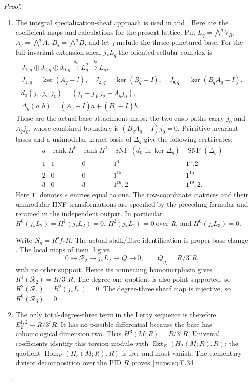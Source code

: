 \begin{proof}
\begin{enumerate}[label=\arabic*.]
\item The integral specialization-sheaf approach is used in
\cite[Lemma 7.25 and Propositions 7.26--7.27, pp.~61--63]{AC26}
and \cite[section ``The integral homology'']{E26}.
Here are the coefficient maps and calculations for the present lattice.  Put $L_q=\bigwedge^qV_R$, $A_q=\bigwedge^qA$,
$B_q=\bigwedge^qB$, and let $j$ include the thrice-punctured base.
For the full invariant-extension sheaf $j_*L_q$ the oriented
cellular complex is
\[
\begin{gathered}
 J_{1,q}\oplus J_{2,q}\oplus J_{0,q}
 \xrightarrow{d_0}L_q^2\xrightarrow{\Delta_q}L_q,\\
 J_{1,q}=\ker(A_q-I),\quad J_{2,q}=\ker(B_q-I),\quad
 J_{0,q}=\ker(B_qA_q-I),\\
 d_0(j_1,j_2,j_0)=(j_1-j_0,j_2-A_qj_0),\\
 \Delta_q(a,b)=(A_q-I)a+(B_q-I)b.
\end{gathered}
\]
These are the actual base attachment maps: the two cusp paths
carry $j_0$ and $A_qj_0$, whose combined boundary is
$(B_qA_q-I)j_0=0$.  Primitive invariant bases and a unimodular
kernel basis of $\Delta_q$ give the following certificates:
\[
\begin{array}{c|c|c|c|c}
q&\operatorname{rank}H^0&\operatorname{rank}H^1&
 \operatorname{SNF}(d_0\text{ in }\ker\Delta_q)&
 \operatorname{SNF}(\Delta_q)\\\hline
1&1&0&1^6&1^5,2\\
2&0&0&1^{15}&1^{15}\\
3&0&3&1^{16},2&1^{19},2.
\end{array}
\]
Here $1^s$ denotes $s$ entries equal to one.  The row-coordinate
matrices and their unimodular HNF transformations are specified
by the preceding formulas and retained in the independent output.
In particular $H^0(j_*L_2)=H^1(j_*L_2)=0$,
$H^2(j_*L_1)=0$ over $R$, and $H^0(j_*L_3)=0$.

Write $\mathcal R_q=R^qf_*R$.  The actual stalk/fibre
identification is proper base change
\cite[Tag 09V5, Lemma 20.18.1]{StacksProject}.
The local maps of item~3 give
\[
 0\longrightarrow\mathcal R_2\longrightarrow j_*L_2
 \longrightarrow Q\longrightarrow0,
 \qquad Q_{p_2}=R/3^rR,
\]
with no other support.  Hence its connecting homomorphism gives
$H^1(\mathcal R_2)=R/3^rR$.
The degree-one quotient is also point supported, so
$H^2(\mathcal R_1)=H^2(j_*L_1)=0$.
The degree-three sheaf map is injective, so
$H^0(\mathcal R_3)=0$.

\item The only total-degree-three term in the Leray sequence
\cite[Tag 01F2, Lemma 20.13.4]{StacksProject} is therefore
$E_2^{1,2}=R/3^rR$.  It has no possible differential because
the base has cohomological dimension two.  Thus
$H^3(M;R)=R/3^rR$.
Universal coefficients
\cite[Theorem 3.2, p.~195]{Hatcher2002} identify this torsion
module with $\operatorname{Ext}_R(H_2(M;R),R)$: the quotient
$\operatorname{Hom}_R(H_3(M;R),R)$ is free and must vanish.
The elementary divisor decomposition over the PID $R$ proves
\eqref{maps:eq:F.34}.


\end{enumerate}
\end{proof}
